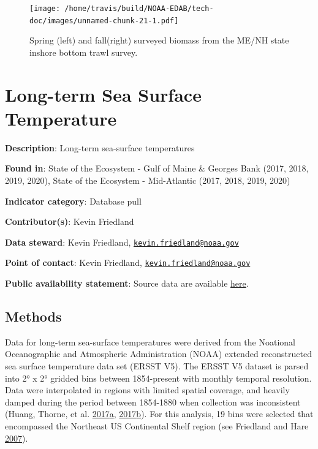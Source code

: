\documentclass[
]{book}
\begin{document}
\begin{figure}
\centering
\texttt{[image: /home/travis/build/NOAA-EDAB/tech-doc/images/unnamed-chunk-21-1.pdf]}
\caption{\label{fig:unnamed-chunk-21}Spring (left) and fall(right) surveyed biomass from the ME/NH state inshore bottom trawl survey.}
\end{figure}

\hypertarget{long-term-sea-surface-temperature}{%
\chapter{Long-term Sea Surface Temperature}\label{long-term-sea-surface-temperature}}

\textbf{Description}: Long-term sea-surface temperatures

\textbf{Found in}: State of the Ecosystem - Gulf of Maine \& Georges Bank (2017, 2018, 2019, 2020), State of the Ecosystem - Mid-Atlantic (2017, 2018, 2019, 2020)

\textbf{Indicator category}: Database pull

\textbf{Contributor(s)}: Kevin Friedland

\textbf{Data steward}: Kevin Friedland, \href{mailto:kevin.friedland@noaa.gov}{\nolinkurl{kevin.friedland@noaa.gov}}

\textbf{Point of contact}: Kevin Friedland, \href{mailto:kevin.friedland@noaa.gov}{\nolinkurl{kevin.friedland@noaa.gov}}

\textbf{Public availability statement}: Source data are available \href{https://www.esrl.noaa.gov/psd/data/gridded/data.noaa.ersst.v5.html}{here}.

\hypertarget{methods-22}{%
\section{Methods}\label{methods-22}}

Data for long-term sea-surface temperatures were derived from the Noational Oceanographic and Atmospheric Administration (NOAA) extended reconstructed sea surface temperature data set (ERSST V5). The ERSST V5 dataset is parsed into 2° x 2° gridded bins between 1854-present with monthly temporal resolution. Data were interpolated in regions with limited spatial coverage, and heavily damped during the period between 1854-1880 when collection was inconsistent (Huang, Thorne, et al. \protect\hyperlink{ref-Huang2017}{2017}\protect\hyperlink{ref-Huang2017}{a}, \protect\hyperlink{ref-huang2017extended}{2017}\protect\hyperlink{ref-huang2017extended}{b}). For this analysis, 19 bins were selected that encompassed the Northeast US Continental Shelf region (see Friedland and Hare \protect\hyperlink{ref-Friedland2007}{2007}).
\end{document}
